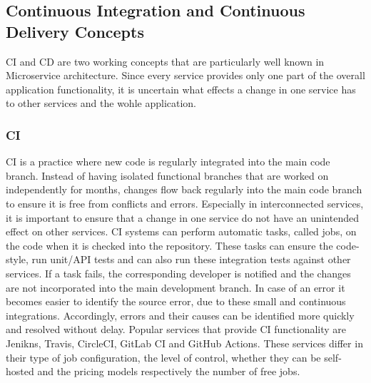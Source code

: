 \documentclass[12pt, a4paper]{article}
\begin{document}
    \subsection{Continuous Integration and Continuous Delivery Concepts}\label{ssec::ci_cd}
    \acl{CI} and \acl{CD} are two working concepts that are particularly well known in Microservice architecture. Since every service provides only one part of the overall application functionality, it is uncertain what effects a change in one service has to other services and the wohle application.
    \subsubsection{\acl{CI}}
    \acl{CI} is a practice where new code is regularly integrated into the main code branch. Instead of having isolated functional branches that are worked on independently for months, changes flow back regularly into the main code branch to ensure it is free from conflicts and errors. Especially in interconnected services, it is important to ensure that a change in one service do not have an unintended effect on other services. \ac{CI} systems can perform automatic tasks, called jobs, on the code when it is checked into the repository. These tasks can ensure the code-style, run unit/\ac{API} tests and can also run these integration tests against other services. If a task fails, the corresponding developer is notified and the changes are not incorporated into the main development branch. In case of an error it becomes easier to identify the source error, due to these small and continuous integrations. Accordingly, errors and their causes can be identified more quickly and resolved without delay.\newline
    Popular services that provide \acl{CI} functionality are Jenikns, Travis, CircleCI, GitLab \ac{CI} and GitHub Actions. These services differ in their type of job configuration, the level of control, whether they can be self-hosted and the pricing models respectively the number of free jobs.
\end{document}

